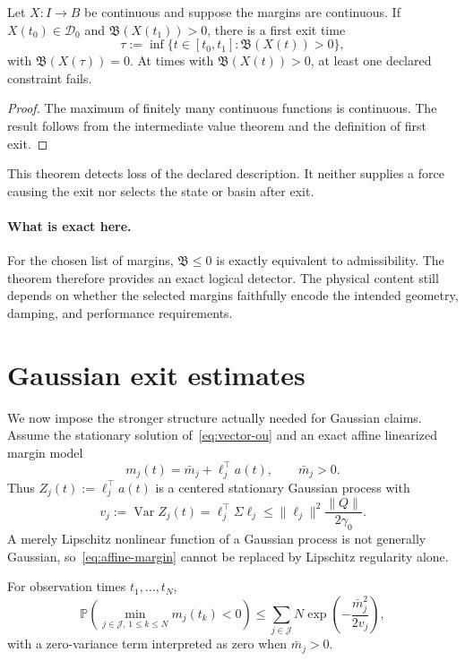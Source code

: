 \documentclass[11pt]{article}
\begin{document}
\begin{theorem}\label{thm:exit}
Let $X:I\to B$ be continuous and suppose the margins are continuous. If
$X(t_0)\in\mathcal D_0$ and $\mathfrak B(X(t_1))>0$, there is a first exit time
\[
 \tau:=\inf\{t\in[t_0,t_1]:\mathfrak B(X(t))>0\},
\]
with $\mathfrak B(X(\tau))=0$. At times with $\mathfrak B(X(t))>0$, at least
one declared constraint fails.
\end{theorem}

\begin{proof}
The maximum of finitely many continuous functions is continuous. The result
follows from the intermediate value theorem and the definition of first exit.
\end{proof}

This theorem detects loss of the declared description. It neither supplies a
force causing the exit nor selects the state or basin after exit.

\paragraph{What is exact here.}
For the chosen list of margins, $\mathfrak B\le0$ is exactly equivalent to
admissibility.  The theorem therefore provides an exact logical detector.
The physical content still depends on whether the selected margins faithfully
encode the intended geometry, damping, and performance requirements.

\section{Gaussian exit estimates}

We now impose the stronger structure actually needed for Gaussian claims.
Assume the stationary solution of~\eqref{eq:vector-ou} and an exact affine
linearized margin model
\begin{equation}
 m_j(t)=\bar m_j+\ell_j^\top a(t),
 \qquad \bar m_j>0 .
 \label{eq:affine-margin}
\end{equation}
Thus $Z_j(t):=\ell_j^\top a(t)$ is a centered stationary Gaussian process with
\[
 v_j:=\operatorname{Var}Z_j(t)
 =\ell_j^\top\Sigma\ell_j
 \le\|\ell_j\|^2\frac{\|Q\|}{2\gamma_0}.
\]
A merely Lipschitz nonlinear function of a Gaussian process is not generally
Gaussian, so~\eqref{eq:affine-margin} cannot be replaced by Lipschitz
regularity alone.

\begin{theorem}\label{thm:grid}
For observation times $t_1,\ldots,t_N$,
\[
 \mathbb P\!\left(\min_{j\in\mathcal J,\,1\le k\le N}m_j(t_k)<0\right)
 \le
 \sum_{j\in\mathcal J}N
 \exp\!\left(-\frac{\bar m_j^2}{2v_j}\right),
\]
with a zero-variance term interpreted as zero when $\bar m_j>0$.
\end{theorem}
\end{document}
